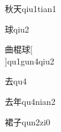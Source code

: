 \begin{verbete}[9;4]{秋天}{qiu1tian1}
\end{verbete}

\begin{verbete}[11]{球}{qiu2}
\end{verbete}

\begin{verbete}[6;12;11]{曲棍球}[\\]{qu1gun4qiu2}
\end{verbete}

\begin{verbete}[5]{去}{qu4}
\end{verbete}

\begin{verbete}[5;6]{去年}{qu4nian2}
\end{verbete}

\begin{verbete}[12;3]{裙子}{qun2zi0}
\end{verbete}

